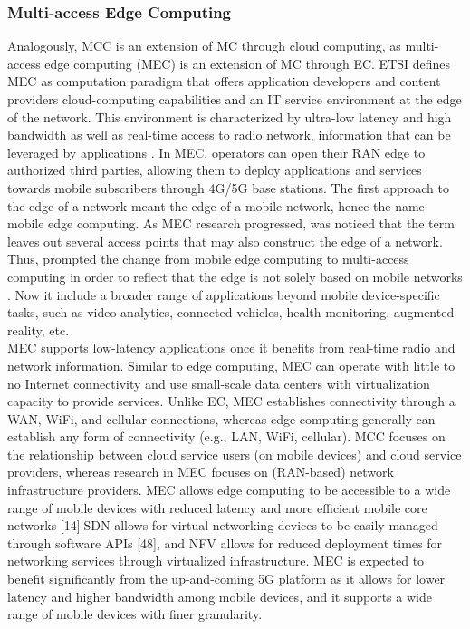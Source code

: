 \subsubsection{Multi-access Edge Computing}
Analogously, MCC is an extension of MC through cloud computing, as multi-access edge computing (MEC) is an extension of MC through EC. ETSI defines MEC as computation paradigm that offers application developers and content providers cloud-computing capabilities and an IT service environment at the edge of the network. This environment is characterized by ultra-low latency and high bandwidth as well as real-time access to radio network, information that can be leveraged by applications \cite{ETSIMult81:online}. In MEC, operators can open their RAN edge to authorized third parties, allowing them to deploy applications and services towards mobile subscribers through 4G/5G base stations. The first approach to the edge of a network meant the edge of a mobile network, hence the name mobile edge computing. As MEC research progressed, was noticed that the term leaves out several access points that may also construct the edge of a network. Thus, prompted the change from mobile edge computing to multi-access computing in order to reflect that the edge is not solely based on mobile networks \cite{MobileEd74:online}. Now it include a broader range of applications beyond mobile device-specific tasks, such as video analytics, connected vehicles, health monitoring, augmented reality, etc.\\
MEC supports low-latency applications once it benefits from real-time radio and network information. Similar to edge computing, MEC can operate with little to no Internet connectivity and use small-scale data centers with virtualization capacity to provide services. Unlike EC, MEC establishes connectivity through a WAN, WiFi, and cellular connections, whereas edge computing generally can establish any form of connectivity (e.g., LAN, WiFi, cellular). MCC focuses on the relationship between cloud service users (on mobile devices) and cloud service providers, whereas research in MEC focuses on (RAN-based) network infrastructure providers. MEC allows edge computing to be accessible to a wide range of mobile devices with reduced latency and more efficient mobile core networks [14].SDN allows for virtual networking devices to be easily managed through software APIs [48], and NFV allows for reduced deployment times for networking services through virtualized infrastructure. MEC is expected to benefit significantly from the up-and-coming 5G platform as it allows for lower latency and higher bandwidth among mobile devices, and it supports a wide range of mobile devices with finer granularity.

